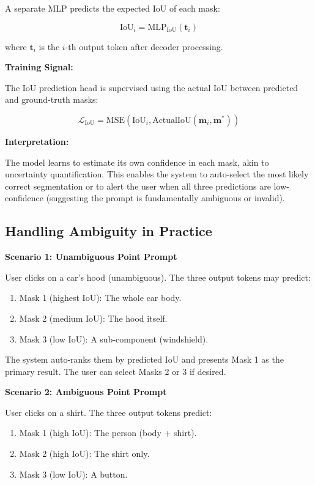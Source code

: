 A separate MLP predicts the expected IoU of each mask:

\[ \text{IoU}_i = \text{MLP}_{\text{IoU}}(\mathbf{t}_i) \]

where $\mathbf{t}_i$ is the $i$-th output token after decoder processing.

\textbf{Training Signal:}

The IoU prediction head is supervised using the actual IoU between predicted and ground-truth masks:

\[ \mathcal{L}_{\text{IoU}} = \text{MSE}(\text{IoU}_i, \text{ActualIoU}(\mathbf{m}_i, \mathbf{m}^*)) \]

\textbf{Interpretation:}

The model learns to estimate its own confidence in each mask, akin to uncertainty quantification. This enables the system to auto-select the most likely correct segmentation or to alert the user when all three predictions are low-confidence (suggesting the prompt is fundamentally ambiguous or invalid).

\subsection{Handling Ambiguity in Practice}

\textbf{Scenario 1: Unambiguous Point Prompt}

User clicks on a car's hood (unambiguous). The three output tokens may predict:
\begin{enumerate}
    \item Mask 1 (highest IoU): The whole car body.
    \item Mask 2 (medium IoU): The hood itself.
    \item Mask 3 (low IoU): A sub-component (windshield).
\end{enumerate}

The system auto-ranks them by predicted IoU and presents Mask 1 as the primary result. The user can select Masks 2 or 3 if desired.

\textbf{Scenario 2: Ambiguous Point Prompt}

User clicks on a shirt. The three output tokens predict:
\begin{enumerate}
    \item Mask 1 (high IoU): The person (body + shirt).
    \item Mask 2 (high IoU): The shirt only.
    \item Mask 3 (low IoU): A button.
\end{enumerate}

